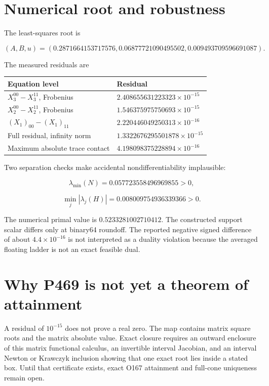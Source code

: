 \documentclass[11pt,a4paper,openany]{report}
\begin{document}
\section{Numerical root and robustness}

The least-squares root is

\[
(A,B,u)=
(0.2871664153717576,
0.06877721090495502,
0.009493709596691087).
\]

The measured residuals are

\begin{center}
\begingroup\small
\setlength{\tabcolsep}{2.5pt}
\renewcommand{\arraystretch}{1.16}
\begin{longtable}{@{}p{}p{}@{}}
\toprule
\textbf{Equation level} & \textbf{Residual} \\
\midrule
\endhead
\(X_3^{00}-X_3^{11}\), Frobenius & \(2.408655631223323\times10^{-15}\) \\
\(X_2^{00}-X_2^{11}\), Frobenius & \(1.546375975750693\times10^{-15}\) \\
\((X_1)_{00}-(X_1)_{11}\) & \(2.220446049250313\times10^{-16}\) \\
Full residual, infinity norm & \(1.3322676295501878\times10^{-15}\) \\
Maximum absolute trace contact & \(4.198098375228894\times10^{-16}\) \\
\bottomrule
\end{longtable}
\endgroup
\end{center}

Two separation checks make accidental nondifferentiability implausible:

\[
\lambda_{\min}(N)=0.057723558496969855>0,
\]

\[
\min_j|\lambda_j(H)|=0.008009754936339366>0.
\]

The numerical primal value is \(0.5233281002710412\). The constructed support scalar differs only at binary64 roundoff. The reported negative signed difference of about \(4.4\times10^{-16}\) is not interpreted as a duality violation because the averaged floating ladder is not an exact feasible dual.

\section{Why P469 is not yet a theorem of attainment}

A residual of \(10^{-15}\) does not prove a real zero. The map contains matrix square roots and the matrix absolute value. Exact closure requires an outward enclosure of this matrix functional calculus, an invertible interval Jacobian, and an interval Newton or Krawczyk inclusion showing that one exact root lies inside a stated box. Until that certificate exists, exact O167 attainment and full-cone uniqueness remain open.
\end{document}
